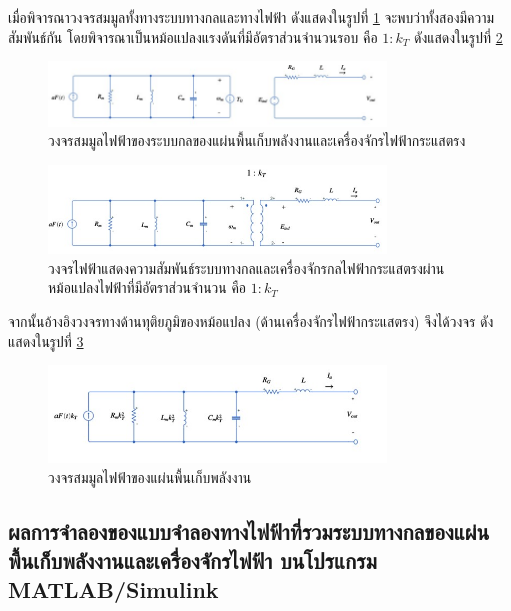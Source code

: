 \documentclass[11pt,a4paper]{article}
\begin{document}
เมื่อพิจารณาวงจรสมมูลทั้งทางระบบทางกลและทางไฟฟ้า ดังแสดงในรูปที่ \ref{mech_and_dc_motor_circuit} จะพบว่าทั้งสองมีความสัมพันธ์กัน โดยพิจารณาเป็นหม้อแปลงแรงดันที่มีอัตราส่วนจำนวนรอบ คือ $1 : k_{T}$ ดังแสดงในรูปที่ \ref{dc_tr}
\begin{figure}[H]
    \begin{center}
        \includegraphics[width=0.8\textwidth]{mech_and_dc_motor_circuit.jpg}
    \end{center}
    \caption{วงจรสมมูลไฟฟ้าของระบบกลของแผ่นพื้นเก็บพลังงานและเครื่องจักรไฟฟ้ากระแสตรง}
    \label{mech_and_dc_motor_circuit}
\end{figure}
\begin{figure}[H]
    \begin{center}
        \includegraphics[width=0.8\textwidth]{dc_tr.jpg}
    \end{center}
    \caption{วงจรไฟฟ้าแสดงความสัมพันธ์ระบบทางกลและเครื่องจักรกลไฟฟ้ากระแสตรงผ่านหม้อแปลงไฟฟ้าที่มีอัตราส่วนจำนวน คือ $1 : k_{T}$}
    \label{dc_tr}
\end{figure}
จากนั้นอ้างอิงวงจรทางด้านทุติยภูมิของหม้อแปลง (ด้านเครื่องจักรไฟฟ้ากระแสตรง) จึงได้วงจร ดังแสดงในรูปที่ \ref{genpath_cicuit} 
\begin{figure}[H]
    \begin{center}
        \includegraphics[width=0.8\textwidth]{genpath_circuit.jpg}
    \end{center}
    \caption{วงจรสมมูลไฟฟ้าของแผ่นพื้นเก็บพลังงาน}
    \label{genpath_cicuit}
\end{figure}



\subsection{ผลการจำลองของแบบจำลองทางไฟฟ้าที่รวมระบบทางกลของแผ่นพื้นเก็บพลังงานและเครื่องจักรไฟฟ้า บนโปรแกรม MATLAB/Simulink}
\end{document}
